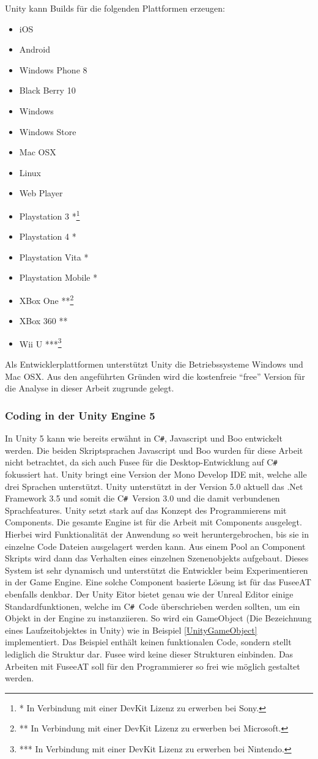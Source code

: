 \documentclass[pagesize, paper=a4, fontsize=12pt, titlepage=true, headings=small, headnosepline, abstractoff, liststotoc, nochapterprefix, plainheadsepline, twoside]{scrreprt}
\newcommand{\CS}{C\texttt{\#}}
\newcommand{\CSS}{C\texttt{\# }}
\begin{document}
Unity kann Builds für die folgenden Plattformen erzeugen:
\begin{itemize}
\item iOS
\item Android
\item Windows Phone 8
\item Black Berry 10
\item Windows
\item Windows Store
\item Mac OSX
\item Linux
\item Web Player
\item Playstation 3 *\footnote{* In Verbindung mit einer DevKit Lizenz zu erwerben bei Sony.}
\item Playstation 4 *
\item Playstation Vita *
\item Playstation Mobile *
\item XBox One **\footnote{** In Verbindung mit einer DevKit Lizenz zu erwerben bei Microsoft.}
\item XBox 360 **
\item Wii U  ***\footnote{*** In Verbindung mit einer DevKit Lizenz zu erwerben bei Nintendo.}
\end{itemize}

Als Entwicklerplattformen unterstützt Unity die Betriebssysteme Windows und Mac OSX. Aus den angeführten Gründen wird die kostenfreie “free” Version für die Analyse in dieser Arbeit zugrunde gelegt.

\subsubsection{Coding in der Unity Engine 5}
In Unity 5 kann wie bereits erwähnt in \CS, Javascript und Boo entwickelt werden. Die beiden Skriptsprachen Javascript und Boo wurden für diese Arbeit nicht betrachtet, da sich auch Fusee für die Desktop-Entwicklung auf \CSS fokussiert hat. Unity bringt eine Version der Mono Develop IDE mit, welche alle drei Sprachen unterstützt. Unity unterstützt in der Version 5.0 aktuell das .Net Framework 3.5 und somit die \CSS Version 3.0 und die damit verbundenen Sprachfeatures. Unity setzt stark auf das Konzept des Programmierens mit Components. Die gesamte Engine ist für die Arbeit mit Components ausgelegt. Hierbei wird Funktionalität der Anwendung so weit heruntergebrochen, bis sie in einzelne Code Dateien ausgelagert werden kann. Aus einem Pool an Component Skripts wird dann das Verhalten eines einzelnen Szenenobjekts aufgebaut. Dieses System ist sehr dynamisch und unterstützt die Entwickler beim Experimentieren in der Game Engine. Eine solche Component basierte Lösung ist für das FuseeAT ebenfalls denkbar. Der Unity Eitor bietet genau wie der Unreal Editor einige Standardfunktionen, welche im \CSS Code überschrieben werden sollten, um ein Objekt in der Engine zu instanziieren. So wird ein GameObject (Die Bezeichnung eines Laufzeitobjektes in Unity) wie in Beispiel \ref{UnityGameObject} implementiert. Das Beispiel enthält keinen funktionalen Code, sondern stellt lediglich die Struktur dar. Fusee wird keine dieser Strukturen einbinden. Das Arbeiten mit FuseeAT soll für den Programmierer so frei wie möglich gestaltet werden.
\end{document}
